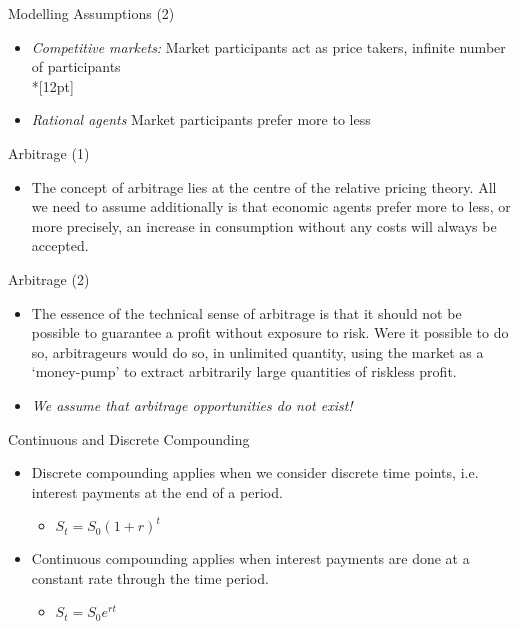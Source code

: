 { Modelling Assumptions (2)}
\begin{itemize}
\item<1-> {\it Competitive markets:}  Market participants
act as price takers, infinite number of participants\\*[12pt]
\item<2-> {\it Rational agents} Market
participants prefer more to less
\end{itemize}

{ Arbitrage (1)}
\begin{itemize}
  \item The concept of arbitrage lies at
the centre of the relative pricing theory. All we need to assume additionally is
that economic agents prefer
more to less, or more precisely, an increase in consumption
without any costs will always be accepted.
\end{itemize}

{ Arbitrage (2)}
\begin{itemize}
  \item The essence of the technical sense of arbitrage is that it should
not be possible to guarantee a profit without exposure to risk.
Were it possible to do so, arbitrageurs would do so, in unlimited quantity,
using the market as a \lq {money-pump}' to extract arbitrarily
large quantities of riskless profit.
  \item {\it We assume that arbitrage opportunities do not exist!}
\end{itemize}

{Continuous and Discrete Compounding}
\begin{itemize}
  \item <1->Discrete compounding applies when we consider discrete time points, i.e. interest payments at the end of a period.\\
      \begin{itemize}
        \item $S_t = S_0 (1+r)^t$
      \end{itemize}

  \item<2-> Continuous compounding applies when interest payments are done at a constant rate through the time period. \\
      \begin{itemize}
        \item $S_t = S_0e^{rt}$
      \end{itemize}
 \end{itemize}

